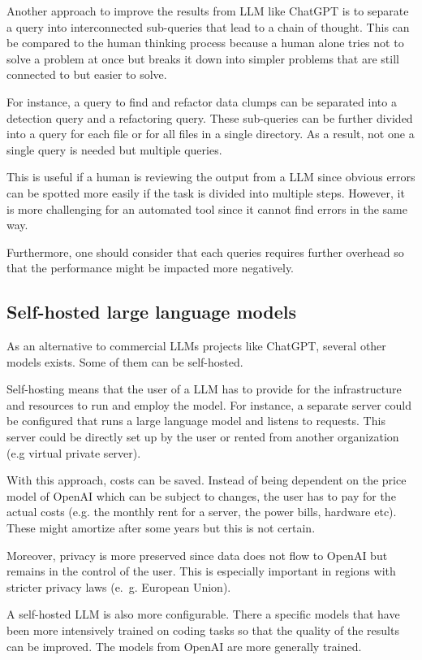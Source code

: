 Another approach to improve the results from \ac{LLM} like ChatGPT is to separate a query into interconnected sub-queries that lead to a chain of thought. This can be compared to the human thinking process because a human alone tries not to solve a problem at once but breaks it down into simpler problems that are still connected to but easier to solve. \cite{Wei2022ChainOT}

For instance, a query to find and refactor data clumps can be separated into a detection query and a refactoring query. These sub-queries can be further divided into a query for each file or for all files in a single directory. As a result, not one a single query is needed but multiple queries. 

This is useful if a human is reviewing the output from a \ac{LLM} since obvious errors can be spotted more easily if the task is divided into multiple steps. However, it is more challenging for an automated tool since it cannot find errors in the same way. 

Furthermore, one should consider that each queries requires further overhead so that the performance might be impacted more negatively. 
\subsection{Self-hosted large language models}

As an alternative to commercial  \ac{LLM}s projects like ChatGPT, several other models exists. Some of them can be self-hosted.  

Self-hosting means that the user of a \ac{LLM} has to provide for the infrastructure and resources to run and employ the model. For instance, a separate server could be configured that runs a large language model and listens to requests. This server could be directly set up by the user or rented from another organization (e.g virtual private server). 

With this approach, costs can be saved. Instead of being dependent on the price model of OpenAI which can be subject to changes, the user has to pay for the actual costs (e.g. the monthly rent for a server, the power bills, hardware etc). These might amortize after some years but this is not certain.

Moreover, privacy is more preserved since data does not flow to OpenAI but remains in the control of the user. This is especially important in regions with stricter privacy laws (e.~g. European Union).

A self-hosted \ac{LLM} is also more configurable. There a specific models that have been more intensively trained on coding tasks so that the quality of the results can be improved. The models from OpenAI are more generally trained. 

